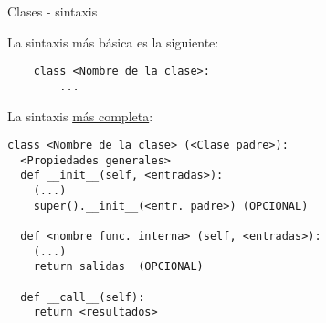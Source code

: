 \begin{frame}[fragile]{Clases - sintaxis}\vspace{0pt}

La sintaxis más básica es la siguiente:

\begin{center}
\begin{lstlisting}
	class <Nombre de la clase>:
		...
\end{lstlisting}
\end{center}

La sintaxis \underline{más completa}:

\begin{center}
\begin{lstlisting}
class <Nombre de la clase> (<Clase padre>):
  <Propiedades generales>
  def __init__(self, <entradas>):
    (...)
    super().__init__(<entr. padre>)	(OPCIONAL)
	
  def <nombre func. interna> (self, <entradas>):
    (...)
    return salidas	(OPCIONAL)
  
  def __call__(self):
  	return <resultados>
\end{lstlisting}
\end{center}

\end{frame}